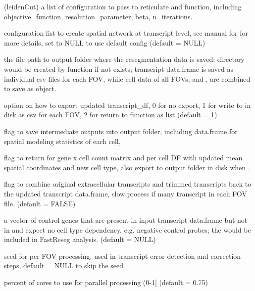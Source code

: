 \documentclass[letterpaper]{book}
\begin{document}
\begin{Arguments}
\begin{ldescription}
\item[\code{leiden\_config}] (leidenCut) a list of configuration to pass to reticulate and  function, including objective\_function, resolution\_parameter, beta, n\_iterations.

\item[\code{config\_spatNW\_transcript}] configuration list to create spatial network at transcript level, see manual for  for more details, set to NULL to use default config (default = NULL)

\item[\code{path\_to\_output}] the file path to output folder where the resegmentation data is saved; directory would be created by function if not exists; transcript data.frame  is saved as individual csv files for each FOV, while cell data of all FOVs,  and , are combined to save as  object.

\item[\code{transDF\_export\_option}] option on how to export updated transcript\_df, 0 for no export, 1 for write to  in disk as csv for each FOV, 2 for return to function as list (default = 1)

\item[\code{save\_intermediates}] flag to save intermediate outputs into output folder, including data.frame for spatial modeling statistics of each cell,

\item[\code{return\_perCellData}] flag to return for gene x cell count matrix and per cell DF with updated mean spatial coordinates and new cell type, also export to output folder in disk when .

\item[\code{combine\_extra}] flag to combine original extracellular transcripts and trimmed transcripts back to the updated transcript data.frame, slow process if many transcript in each FOV file. (default = FALSE)

\item[\code{ctrl\_genes}] a vector of control genes that are present in input transcript data.frame but not in  and expect no cell type dependency, e.g. negative control probes; the  would be included in FastReseg analysis. (default = NULL)

\item[\code{seed\_process}] seed for per FOV processing, used in transcript error detection and correction steps, default = NULL to skip the seed

\item[\code{percentCores}] percent of cores to use for parallel processing (0-1] (default = 0.75)
\end{ldescription}
\end{Arguments}
\end{document}
